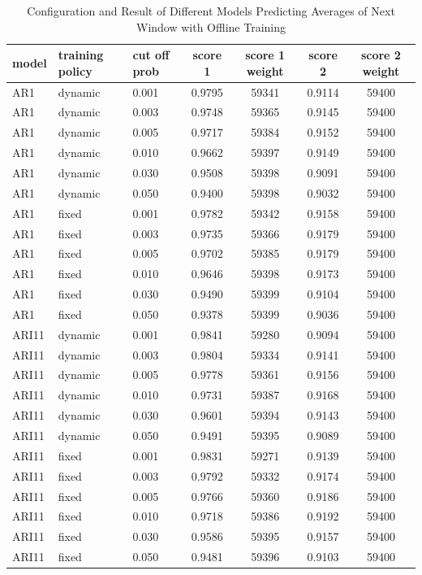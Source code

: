 \documentclass{article}
\begin{document}
\begin{table}[htbp]
  \begin{center}
    \caption{Configuration and Result of Different Models Predicting Averages of Next Window with Offline Training}
    \label{tab:tab1.10.1}
    \begin{tabular}{l|l|l|*{4}{c}}
      \textbf{model} & \textbf{training policy} & \textbf{cut off prob} & \textbf{score 1} & \textbf{score 1 weight} & \textbf{score 2} & \textbf{score 2 weight} \\
      \hline
      AR1 & dynamic & 0.001 & 0.9795 & 59341 & 0.9114 & 59400\\
      AR1 & dynamic & 0.003 & 0.9748 & 59365 & 0.9145 & 59400\\
      AR1 & dynamic & 0.005 & 0.9717 & 59384 & 0.9152 & 59400\\
      AR1 & dynamic & 0.010 & 0.9662 & 59397 & 0.9149 & 59400\\
      AR1 & dynamic & 0.030 & 0.9508 & 59398 & 0.9091 & 59400\\
      AR1 & dynamic & 0.050 & 0.9400 & 59398 & 0.9032 & 59400\\
      AR1 & fixed & 0.001 & 0.9782 & 59342 & 0.9158 & 59400\\
      AR1 & fixed & 0.003 & 0.9735 & 59366 & 0.9179 & 59400\\
      AR1 & fixed & 0.005 & 0.9702 & 59385 & 0.9179 & 59400\\
      AR1 & fixed & 0.010 & 0.9646 & 59398 & 0.9173 & 59400\\
      AR1 & fixed & 0.030 & 0.9490 & 59399 & 0.9104 & 59400\\
      AR1 & fixed & 0.050 & 0.9378 & 59399 & 0.9036 & 59400\\
      ARI11 & dynamic & 0.001 & 0.9841 & 59280 & 0.9094 & 59400\\
      ARI11 & dynamic & 0.003 & 0.9804 & 59334 & 0.9141 & 59400\\
      ARI11 & dynamic & 0.005 & 0.9778 & 59361 & 0.9156 & 59400\\
      ARI11 & dynamic & 0.010 & 0.9731 & 59387 & 0.9168 & 59400\\
      ARI11 & dynamic & 0.030 & 0.9601 & 59394 & 0.9143 & 59400\\
      ARI11 & dynamic & 0.050 & 0.9491 & 59395 & 0.9089 & 59400\\
      ARI11 & fixed & 0.001 & 0.9831 & 59271 & 0.9139 & 59400\\
      ARI11 & fixed & 0.003 & 0.9792 & 59332 & 0.9174 & 59400\\
      ARI11 & fixed & 0.005 & 0.9766 & 59360 & 0.9186 & 59400\\
      ARI11 & fixed & 0.010 & 0.9718 & 59386 & 0.9192 & 59400\\
      ARI11 & fixed & 0.030 & 0.9586 & 59395 & 0.9157 & 59400\\
      ARI11 & fixed & 0.050 & 0.9481 & 59396 & 0.9103 & 59400\\
    \end{tabular}
  \end{center}
\end{table}
\end{document}
